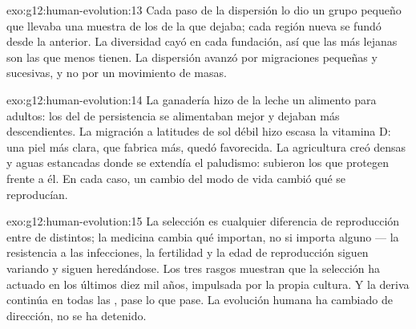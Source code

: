 \begin{solution}{exo:g12:human-evolution:13}
Cada paso de la dispersión lo dio un grupo pequeño que llevaba una
muestra de los  de la  que dejaba; cada región nueva se
fundó desde la anterior. La diversidad cayó en cada fundación, así que
las  más lejanas son las que menos tienen. La dispersión
avanzó por migraciones pequeñas y sucesivas, y no por un movimiento de
masas.
\end{solution}

\begin{solution}{exo:g12:human-evolution:14}
La ganadería hizo de la leche un alimento para adultos: los 
del  de persistencia se alimentaban mejor y dejaban más
descendientes. La migración a latitudes de sol débil hizo escasa la
vitamina D: una piel más clara, que fabrica más, quedó favorecida. La
agricultura creó  densas y aguas estancadas donde se
extendía el paludismo: subieron los  que protegen frente a él. En
cada caso, un cambio del modo de vida cambió qué  se reproducían.
\end{solution}

\begin{solution}{exo:g12:human-evolution:15}
La selección es cualquier diferencia de reproducción entre 
de  distintos; la medicina cambia qué  importan, no si
importa alguno --- la resistencia a las infecciones, la fertilidad y la
edad de reproducción siguen variando y siguen heredándose. Los tres
rasgos muestran que la selección ha actuado en los últimos diez mil
años, impulsada por la propia cultura. Y la deriva continúa en todas
las , pase lo que pase. La evolución humana ha cambiado de
dirección, no se ha detenido.
\end{solution}

